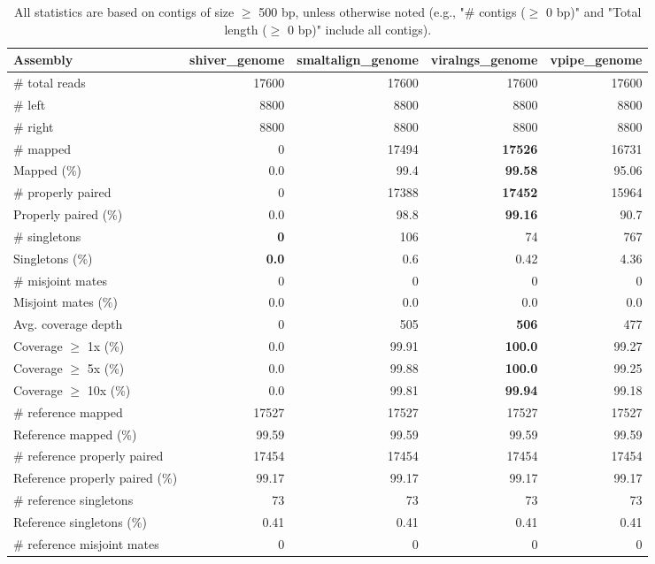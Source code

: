 \documentclass[12pt,a4paper]{article}
\begin{document}
\begin{table}[ht]
\begin{center}
\caption{All statistics are based on contigs of size $\geq$ 500 bp, unless otherwise noted (e.g., "\# contigs ($\geq$ 0 bp)" and "Total length ($\geq$ 0 bp)" include all contigs).}
\begin{tabular}{|l*{4}{|r}|}
\hline
Assembly & shiver\_genome & smaltalign\_genome & viralngs\_genome & vpipe\_genome \\ \hline
\# total reads & 17600 & 17600 & 17600 & 17600 \\ \hline
\# left & 8800 & 8800 & 8800 & 8800 \\ \hline
\# right & 8800 & 8800 & 8800 & 8800 \\ \hline
\# mapped & 0 & 17494 & {\bf 17526} & 16731 \\ \hline
Mapped (\%) & 0.0 & 99.4 & {\bf 99.58} & 95.06 \\ \hline
\# properly paired & 0 & 17388 & {\bf 17452} & 15964 \\ \hline
Properly paired (\%) & 0.0 & 98.8 & {\bf 99.16} & 90.7 \\ \hline
\# singletons & {\bf 0} & 106 & 74 & 767 \\ \hline
Singletons (\%) & {\bf 0.0} & 0.6 & 0.42 & 4.36 \\ \hline
\# misjoint mates & 0 & 0 & 0 & 0 \\ \hline
Misjoint mates (\%) & 0.0 & 0.0 & 0.0 & 0.0 \\ \hline
Avg. coverage depth & 0 & 505 & {\bf 506} & 477 \\ \hline
Coverage $\geq$ 1x (\%) & 0.0 & 99.91 & {\bf 100.0} & 99.27 \\ \hline
Coverage $\geq$ 5x (\%) & 0.0 & 99.88 & {\bf 100.0} & 99.25 \\ \hline
Coverage $\geq$ 10x (\%) & 0.0 & 99.81 & {\bf 99.94} & 99.18 \\ \hline
\# reference mapped & 17527 & 17527 & 17527 & 17527 \\ \hline
Reference mapped (\%) & 99.59 & 99.59 & 99.59 & 99.59 \\ \hline
\# reference properly paired & 17454 & 17454 & 17454 & 17454 \\ \hline
Reference properly paired (\%) & 99.17 & 99.17 & 99.17 & 99.17 \\ \hline
\# reference singletons & 73 & 73 & 73 & 73 \\ \hline
Reference singletons (\%) & 0.41 & 0.41 & 0.41 & 0.41 \\ \hline
\# reference misjoint mates & 0 & 0 & 0 & 0 \\ \hline

\end{tabular}
\end{center}
\end{table}
\end{document}
